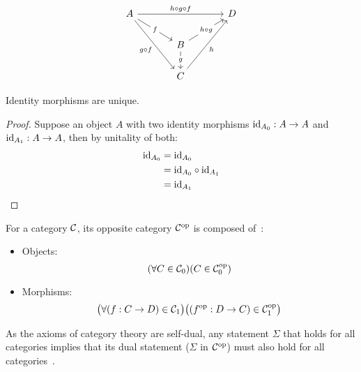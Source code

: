 \begin{example}
  \[\begin{tikzcd}[ampersand replacement=\&,column sep=scriptsize]
    A \&\&\&\& D \\
    \&\& B \\
    \&\& C
    \arrow["f"{description}, from=1-1, to=2-3]
    \arrow["g"{description}, from=2-3, to=3-3]
    \arrow["h"', from=3-3, to=1-5]
    \arrow["{g\circ f}"', from=1-1, to=3-3]
    \arrow["{h\circ g}"{description}, from=2-3, to=1-5]
    \arrow["{h\circ g\circ f}", from=1-1, to=1-5]
  \end{tikzcd}\]
  \vspace{-\baselineskip}
\end{example}

\begin{theorem}
  Identity morphisms are unique.

  \begin{proof}
    Suppose an object $A$ with two identity morphisms $\mathrm{id}_{A_0}: A\to A$ and
    $\mathrm{id}_{A_1}:A\to A$, then by unitality of both:
    \[
      \begin{aligned}
        \mathrm{id}_{A_0} &= \mathrm{id}_{A_0}\\
        &= \mathrm{id}_{A_0} \circ \mathrm{id}_{A_1}\\
        &= \mathrm{id}_{A_1}
      \end{aligned}
    \]
  \end{proof}
\end{theorem}

\begin{definition}

  For a category $\mathcal{C}$, its opposite category $\mathcal{C}^{\mathrm{op}}$ is composed
  of~\parencite[p.~15]{awodey:category_theory}:

  \begin{itemize}
    \item Objects:
      \[(\forall C \in \mathcal{C}_0)
        (C\in \mathcal{C}^{\mathrm{op}}_0)\]
    \item Morphisms:
      \[\big(\forall (f: C\to D) \in \mathcal{C}_1\big)
        \big((f^{\mathrm{op}} : D\to C)\in \mathcal{C}^{\mathrm{op}}_1\big)\]
  \end{itemize}
\end{definition}

\begin{remark}
  As the axioms of category theory are self-dual, any statement $\Sigma$ that
  holds for all categories implies that its dual statement ($\Sigma$ in
  $\mathcal{C}^{\mathrm{op}}$) must also hold for all
  categories~\parencite[p.~16]{leinster:basic_category_theory}.
\end{remark}





